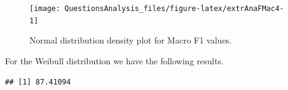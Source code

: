 \documentclass[
]{article}
\newenvironment{Shaded}{\begin{snugshade}}{\end{snugshade}}
\newcommand{\CommentTok}[1]{\textcolor[rgb]{0.56,0.35,0.01}{\textit{#1}}}
\newcommand{\DecValTok}[1]{\textcolor[rgb]{0.00,0.00,0.81}{#1}}
\newcommand{\FunctionTok}[1]{\textcolor[rgb]{0.00,0.00,0.00}{#1}}
\newcommand{\NormalTok}[1]{#1}
\newcommand{\OtherTok}[1]{\textcolor[rgb]{0.56,0.35,0.01}{#1}}
\newcommand{\SpecialCharTok}[1]{\textcolor[rgb]{0.00,0.00,0.00}{#1}}
\newcommand{\StringTok}[1]{\textcolor[rgb]{0.31,0.60,0.02}{#1}}
\begin{document}
\begin{figure}

{\centering \texttt{[image: QuestionsAnalysis\_files/figure-latex/extrAnaFMac4-1]} 

}

\caption{Normal distribution density plot for Macro F1 values.}\label{fig:extrAnaFMac4}
\end{figure}

For the Weibull distribution we have the following results.

\begin{Shaded}
\end{Shaded}

\begin{verbatim}
## [1] 87.41094
\end{verbatim}
\end{document}
